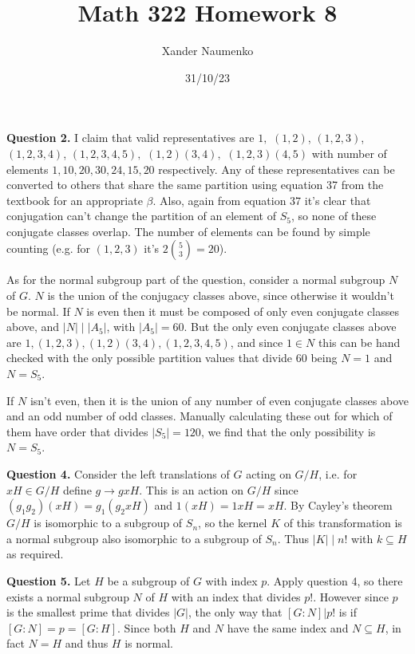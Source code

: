 \documentclass[letterpaper, reqno,11pt]{article}
\begin{document}
\title{Math 322 Homework 8}
\date{31/10/23}
\author{Xander Naumenko}
\maketitle

{\medskip\noindent\bf Question 2.} I claim that valid representatives are $1,$ $(1,2)$, $(1,2,3)$, $(1,2,3,4)$, $(1,2,3,4,5),$ $(1,2)(3,4),$ $(1,2,3)(4,5)$ with number of elements $1,10,20,30,24,15,20$ respectively. Any of these representatives can be converted to others that share the same partition using equation 37 from the textbook for an appropriate $\beta$. Also, again from equation 37 it's clear that conjugation can't change the partition of an element of $S_5$, so none of these conjugate classes overlap. The number of elements can be found by simple counting (e.g. for $(1,2,3)$ it's $2{5\choose 3}=20$).

As for the normal subgroup part of the question, consider a normal subgroup $N$ of $G$. $N$ is the union of the conjugacy classes above, since otherwise it wouldn't be normal. If $N$ is even then it must be composed of only even conjugate classes above, and $|N|\mid |A_5|$, with $|A_5|=60$. But the only even conjugate classes above are $1,(1,2,3),(1,2)(3,4),(1,2,3,4,5)$, and since $1\in N$ this can be hand checked with the only possible partition values that divide $60$ being $N=1$ and $N=S_5$.

If $N$ isn't even, then it is the union of any number of even conjugate classes above and an odd number of odd classes. Manually calculating these out for which of them have order that divides $|S_5|=120$, we find that the only possibility is $N=S_5$.

{\medskip\noindent\bf Question 4.} Consider the left translations of $G$ acting on $G/H$, i.e. for $xH\in G /H$ define $g\to gxH$. This is an action on $G /H$ since $(g_1g_2)(xH)=g_1(g_2xH)$ and $1(xH)=1xH=xH$. By Cayley's theorem $G /H$ is isomorphic to a subgroup of $S_n$, so the kernel $K$ of this transformation is a normal subgroup also isomorphic to a subgroup of $S_n$. Thus $|K|\mid n!$ with $k\subseteq H$ as required.


{\medskip\noindent\bf Question 5.} Let $H$ be a subgroup of $G$ with index $p$. Apply question 4, so there exists a normal subgroup $N$ of $H$ with an index that divides $p!$. However since $p$ is the smallest prime that divides $|G|$, the only way that $[G:N]|p!$ is if $[G:N]=p=[G:H]$. Since both $H$ and $N$ have the same index and $N\subseteq H$, in fact $N=H$ and thus $H$ is normal.
\end{document}
